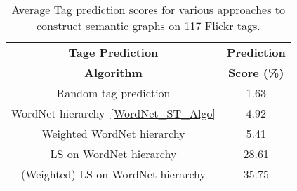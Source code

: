 \begin{table}
\begin{center}
\caption{Average Tag prediction scores for various approaches to construct semantic graphs on 117 Flickr tags. }
\label{tab:TPFlickr117Summary}
\begin{tabular}{|c|c|}
		\hline
		\textbf{Tage Prediction} & \textbf{Prediction}\\ 
		\textbf{Algorithm} & \textbf{Score (\%)}\\ 
		\hline 
		 Random tag prediction   & 1.63  \\
		\hline
		 WordNet hierarchy~\ref{WordNet_ST_Algo} & 4.92  \\
		\hline
		 Weighted WordNet hierarchy  & 5.41  \\
		\hline
		 LS on WordNet hierarchy & 28.61  \\
		\hline
		 (Weighted) LS on WordNet hierarchy   &  35.75  \\
		\hline
\end{tabular}
\end{center}
\end{table}










